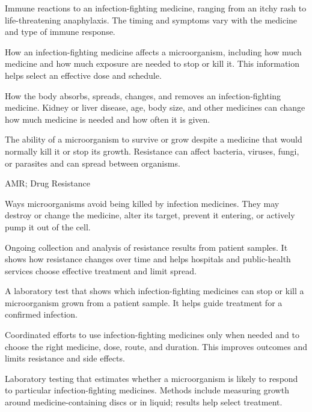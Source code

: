  Immune reactions to an infection-fighting medicine, ranging from an itchy rash to life-threatening anaphylaxis. The timing and symptoms vary with the medicine and type of immune response.

 How an infection-fighting medicine affects a microorganism, including how much medicine and how much exposure are needed to stop or kill it. This information helps select an effective dose and schedule.

 How the body absorbs, spreads, changes, and removes an infection-fighting medicine. Kidney or liver disease, age, body size, and other medicines can change how much medicine is needed and how often it is given.

 The ability of a microorganism to survive or grow despite a medicine that would normally kill it or stop its growth. Resistance can affect bacteria, viruses, fungi, or parasites and can spread between organisms.

\synonyms
AMR; Drug Resistance

 Ways microorganisms avoid being killed by infection medicines. They may destroy or change the medicine, alter its target, prevent it entering, or actively pump it out of the cell.

 Ongoing collection and analysis of resistance results from patient samples. It shows how resistance changes over time and helps hospitals and public-health services choose effective treatment and limit spread.

 A laboratory test that shows which infection-fighting medicines can stop or kill a microorganism grown from a patient sample. It helps guide treatment for a confirmed infection.

 Coordinated efforts to use infection-fighting medicines only when needed and to choose the right medicine, dose, route, and duration. This improves outcomes and limits resistance and side effects.

 Laboratory testing that estimates whether a microorganism is likely to respond to particular infection-fighting medicines. Methods include measuring growth around medicine-containing discs or in liquid; results help select treatment.

